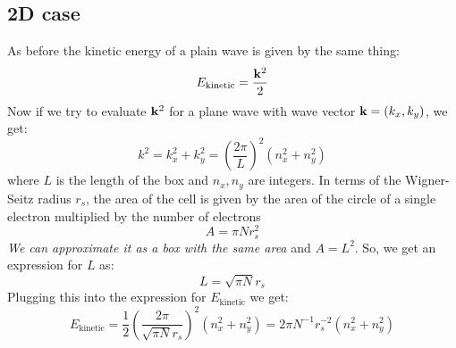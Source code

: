 \documentclass[12pt]{article}
\begin{document}
\subsection{2D case}
As before the kinetic energy of a plain wave is given by the same thing:
\begin{equation}
    E_{\text{kinetic}} = \frac{\vb{k}^2}{2}
\end{equation}
Now if we try to evaluate $\vb{k}^2$ for a plane wave with wave vector $\vb{k} = (k_x, k_y)$, we get:
\begin{equation}
    k^2 = k_x^2 + k_y^2 =  \left(\frac{2\pi}{L}\right)^2 \left(n_x^2 + n_y^2\right)
\end{equation}
where $L$ is the length of the box and $n_x, n_y$ are integers. In terms of the Wigner-Seitz radius $r_s$, the area of the cell is given by the area of the circle of a single electron multiplied by the number of electrons
\begin{equation}
    A = \pi N r_s^2
\end{equation}
\emph{We can approximate it as a box with the same area} and $A= L^2$. So, we get an expression for $L$ as:
\begin{equation}
    L = \sqrt{\pi N} r_s
\end{equation}
Plugging this into the expression for $E_{\text{kinetic}}$ we get:
\begin{equation}
    E_{\text{kinetic}} = \frac{1}{2}\left(\frac{2 \pi}{\sqrt{\pi N} r_s}\right)^2 \left(n_x^2 + n_y^2\right) = 2\pi N^{-1} r_s^{-2} \left(n_x^2 + n_y^2\right)
\end{equation}
\end{document}
